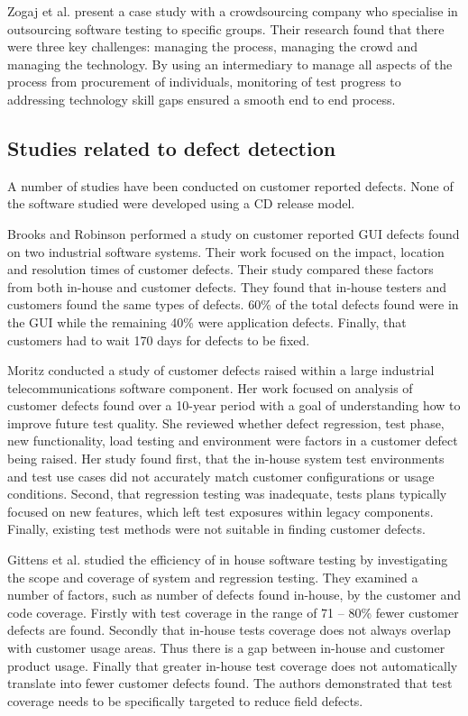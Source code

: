 Zogaj et al. \cite{zogaj2014managing} present a case study with a crowdsourcing company who specialise in outsourcing software testing to specific groups. Their research found that there were three key challenges: managing the process, managing the crowd and managing the technology. By using an intermediary to manage all aspects of the process from procurement of individuals, monitoring of test progress to addressing technology skill gaps ensured a smooth end to end process. 


\subsection{Studies related to defect detection}
A number of studies have been conducted on customer reported defects. None of the software studied were developed using a CD  release model. \par

Brooks and Robinson \cite{brooks2009initial} performed a study on customer reported GUI defects found on two industrial software systems. Their work focused on the impact, location and resolution times of customer defects. Their study compared these factors from both in-house and customer defects. They found that in-house testers and customers found the same types of defects. 60\% of the total defects found were in the GUI while the remaining 40\% were application defects. Finally, that customers had to wait 170 days for defects to be fixed. \par

Moritz \cite{moritz2009case} conducted a study of customer defects raised within a large industrial telecommunications software component. Her work focused on analysis of customer defects found over a 10-year period with a goal of understanding how to improve future test quality. She reviewed whether defect regression, test phase, new functionality, load testing and environment were factors in a customer defect being raised. Her study found first, that the in-house system test environments and test use cases did not accurately match customer configurations or usage conditions. Second, that regression testing was inadequate, tests plans typically focused on new features,  which left test exposures within legacy components. Finally, existing test methods were not suitable in finding customer defects. \par

 Gittens et al. \cite{gittens2002empirical} studied the efficiency of in house software testing by investigating the scope and coverage of system and regression testing. They examined a number of factors, such as number of defects found in-house, by the customer and code coverage. Firstly with test coverage in the range of 71 -- 80\% fewer customer defects are found. Secondly that in-house tests coverage does not always overlap with customer usage areas. Thus there is a gap between in-house and customer product usage. Finally that greater in-house test coverage does not automatically translate into fewer customer defects found. The authors demonstrated that test coverage needs to be specifically targeted to reduce field defects. \par
 
